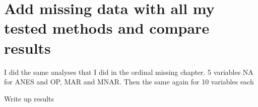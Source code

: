 \documentclass[12pt]{article}
\begin{document}
\section*{Add missing data with all my tested methods and compare results}
	\begin{coi}
		\item I did the same analyses that I did in the ordinal missing chapter. 5 variables NA for ANES and OP, MAR and MNAR. Then the same again for 10 variables each
		\item Write up results
	\end{coi}


\end{document}
